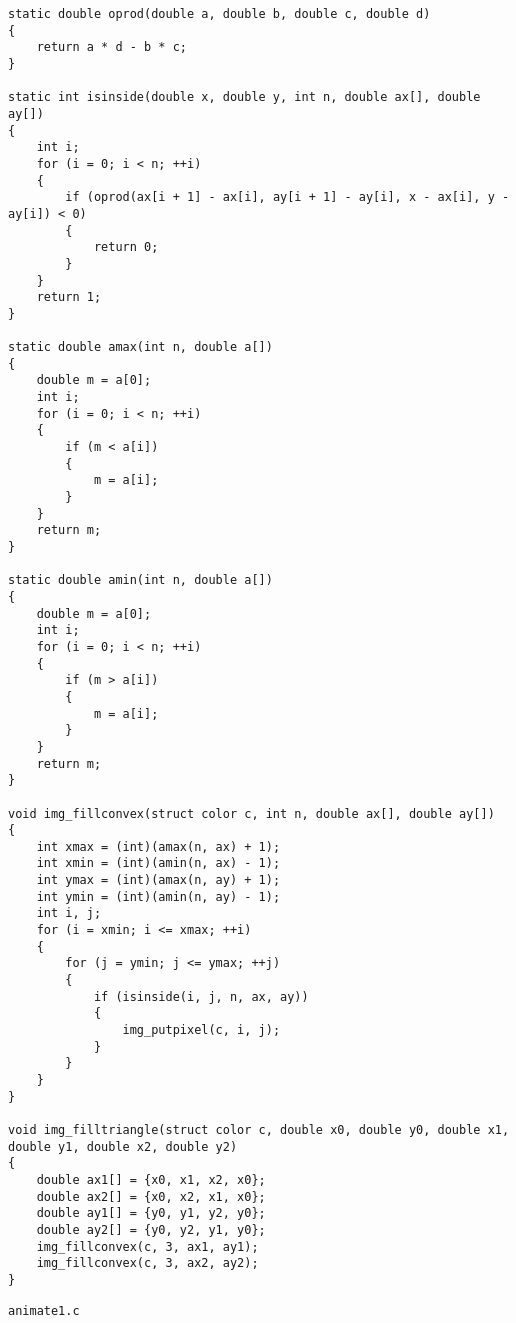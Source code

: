 \documentclass[12pt,a4j]{jarticle}
\begin{document}
\begin{verbatim}
static double oprod(double a, double b, double c, double d)
{
    return a * d - b * c;
}

static int isinside(double x, double y, int n, double ax[], double ay[])
{
    int i;
    for (i = 0; i < n; ++i)
    {
        if (oprod(ax[i + 1] - ax[i], ay[i + 1] - ay[i], x - ax[i], y - ay[i]) < 0)
        {
            return 0;
        }
    }
    return 1;
}

static double amax(int n, double a[])
{
    double m = a[0];
    int i;
    for (i = 0; i < n; ++i)
    {
        if (m < a[i])
        {
            m = a[i];
        }
    }
    return m;
}

static double amin(int n, double a[])
{
    double m = a[0];
    int i;
    for (i = 0; i < n; ++i)
    {
        if (m > a[i])
        {
            m = a[i];
        }
    }
    return m;
}

void img_fillconvex(struct color c, int n, double ax[], double ay[])
{
    int xmax = (int)(amax(n, ax) + 1);
    int xmin = (int)(amin(n, ax) - 1);
    int ymax = (int)(amax(n, ay) + 1);
    int ymin = (int)(amin(n, ay) - 1);
    int i, j;
    for (i = xmin; i <= xmax; ++i)
    {
        for (j = ymin; j <= ymax; ++j)
        {
            if (isinside(i, j, n, ax, ay))
            {
                img_putpixel(c, i, j);
            }
        }
    }
}

void img_filltriangle(struct color c, double x0, double y0, double x1, double y1, double x2, double y2)
{
    double ax1[] = {x0, x1, x2, x0};
    double ax2[] = {x0, x2, x1, x0};
    double ay1[] = {y0, y1, y2, y0};
    double ay2[] = {y0, y2, y1, y0};
    img_fillconvex(c, 3, ax1, ay1);
    img_fillconvex(c, 3, ax2, ay2);
}

\end{verbatim}

\verb|animate1.c|
\end{document}
